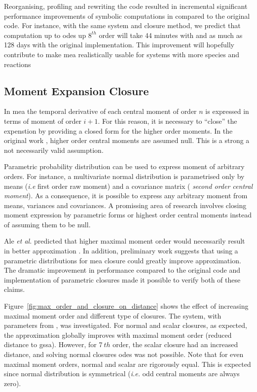 Reorganising, profiling and rewriting the code resulted in incremental significant performance improvements of symbolic computations in \means{} compared to the original \mat{} code.
For instance, with the same \pft{} system and closure method, 
we predict that computation up to \gls{ode}s up $8^{th}$ order will take 44 minutes with \means{} and as much as 128 days with the original implementation.
This improvement will hopefully contribute to make \gls{mea} realistically usable for systems with more species and reactions


\subsection{Moment Expansion Closure}

In \gls{mea} the temporal derivative of each central moment of order $n$ is expressed in terms of moment of order $i+1$.
For this reason, it is necessary to ``close'' the expenstion by providing a closed form for the higher order moments.
In the original work \cite{ale_general_2013}, higher order central moments are assumed null. 
This is a strong a not necessarily valid assumption. 

Parametric probability distribution can be used to express moment of arbitrary orders. 
For instance, a multivariate normal distribution is parametrised only by means (\emph{i.e } first order raw moment)
and a covariance matrix (\emph{ second order central moment}). As a consequence, it is possible to express any arbitrary moment from means, variances and covariances. 
A promissing area of research involves closing moment expression by parametric forms or highest order central moments instead of assuming them to be null.






Ale \emph{et al.} predicted that higher maximal moment order would necessarily result in better approximation \cite{ale_general_2013}.
In addition, preliminary work  suggests that using a parametric distributions for \gls{mea}
closure could greatly improve approximation.
The dramatic improvement in performance compared to the original code and implementation of parametric closures
made it possible to verify both of these claims.

Figure~\ref{fig:max_order_and_closure_on_distance} shows the effect of increasing maximal moment order and different type of closures.
The \pft system, with parameters from \cite{ale_general_2013}, was investigated.
For normal and scalar closures, as expected, the approximation globally improves with maximal moment order (reduced distance to \gls{gssa}).
However, for 7$~{th}$ order, the scalar closure had an increased distance, and solving normal closures \gls{ode}s was not possible.
Note that for even maximal moment orders, normal and scalar are rigorously equal.
This is expected since normal distribution is symmetrical (\emph{i.e.} odd central moments are always zero).

